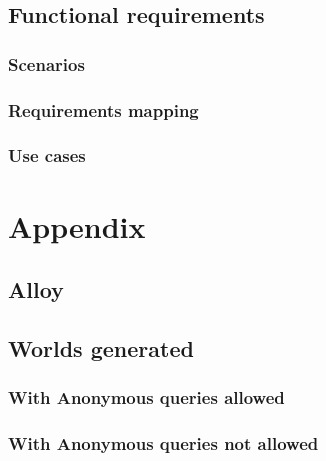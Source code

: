 \documentclass[a4paper,oneside,11pt]{article}
\begin{document}
        \subsection{Functional requirements}
            
        \subsubsection{Scenarios}
            
            
        \subsubsection{Requirements mapping}
            
        
        \newpage
        \subsubsection{Use cases}
            
        \section{Appendix}
            \subsection{Alloy}
                
            \subsection{Worlds generated}
                \subsubsection{With Anonymous queries allowed}
                    
                \subsubsection{With Anonymous queries not allowed}
                
\end{document}

